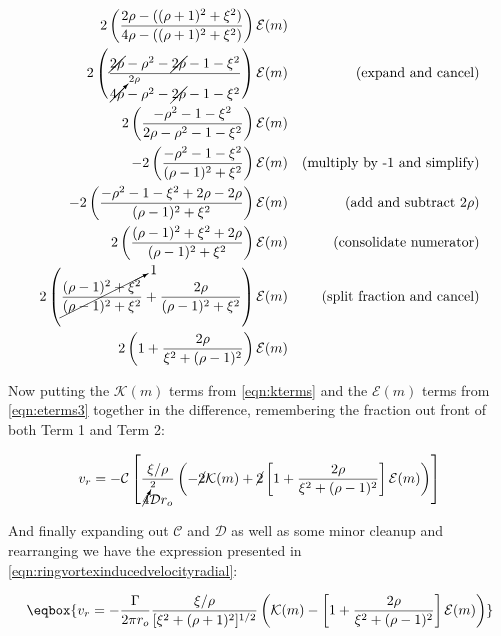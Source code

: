 \begin{equation}
    \label{eqn:eterms3}
    \begin{aligned}
        2\left(\frac{2\rho-((\rho+1)^2+\xi^2)}{4\rho-((\rho+1)^2+\xi^2)} \right)\mathcal{E}(m) \\
        2\left(\frac{\cancel{2\rho}-\rho^2-\cancel{2\rho}-1-\xi^2}{\cancelto{2\rho}{4\rho}-\rho^2 - \cancel{2\rho} -1 -\xi^2} \right)\mathcal{E}(m) && \text{(expand and cancel)} \\
        2\left(\frac{-\rho^2-1-\xi^2}{2\rho-\rho^2 - 1 -\xi^2} \right)\mathcal{E}(m)\\
        -2\left(\frac{-\rho^2-1-\xi^2}{(\rho- 1)^2 +\xi^2} \right)\mathcal{E}(m) && \text{(multiply by -1 and simplify)} \\
        -2\left(\frac{-\rho^2-1-\xi^2 + 2\rho - 2\rho}{(\rho- 1)^2 +\xi^2} \right)\mathcal{E}(m) && \text{(add and subtract }2\rho)\\
        2\left(\frac{(\rho-1)^2+\xi^2 + 2\rho}{(\rho- 1)^2 +\xi^2} \right)\mathcal{E}(m) && \text{(consolidate numerator)}\\
        2\left(\cancelto{1}{\frac{(\rho-1)^2+\xi^2 }{(\rho- 1)^2 +\xi^2}} +\frac{ 2\rho}{(\rho- 1)^2 +\xi^2} \right)\mathcal{E}(m) && \text{(split fraction and cancel)} \\
        2\left(1 + \frac{2\rho}{\xi^2 + (\rho- 1)^2} \right)\mathcal{E}(m) \\
    \end{aligned}
\end{equation}

\noindent Now putting the \(\mathcal{K}(m)\) terms from \cref{eqn:kterms} and the \(\mathcal{E}(m)\) terms from \cref{eqn:eterms3} together in the difference, remembering the fraction out front of both Term 1 and Term 2:

\begin{equation}
    v_r = -\mathcal{C} \left[\frac{\xi/\rho}{\cancelto{2}{4}\mathcal{D}r_o} \left(-\cancel{2}\mathcal{K}(m)+\cancel{2}\left[1+\frac{2\rho}{\xi^2+(\rho-1)^2}\right]\mathcal{E}(m) \right) \right]
\end{equation}

\noindent And finally expanding out \(\mathcal{C}\) and \(\mathcal{D}\) as well as some minor cleanup and rearranging we have the expression presented in \cref{eqn:ringvortexinducedvelocityradial}:

\begin{equation}
    \eqbox{
    v_r = -\frac{\Gamma}{2\pi r_o}\frac{\xi/\rho}{[\xi^2+(\rho+1)^2]^{1/2}} \left(\mathcal{K}(m)-\left[1+\frac{2\rho}{\xi^2+(\rho-1)^2}\right]\mathcal{E}(m) \right)
}
\end{equation}


